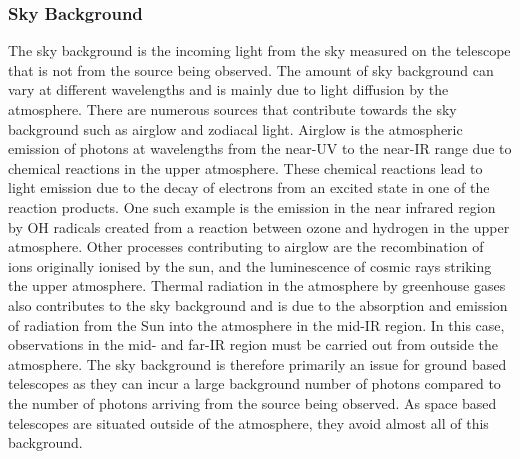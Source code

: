 	\subsubsection{Sky Background} %
	\label{ssub:sky_background}
		The sky background is the incoming light from the sky measured on the telescope that is not from the source being observed. The amount of sky background can vary at different wavelengths and is mainly due to light diffusion by the atmosphere. There are numerous sources that contribute towards the sky background such as airglow and zodiacal light. Airglow is the atmospheric emission of photons at wavelengths from the near-UV to the near-IR range due to chemical reactions in the upper atmosphere\cite[page~9]{atmospheric_radiation_model}. These chemical reactions lead to light emission due to the decay of electrons from an excited state in one of the reaction products. One such example is the emission in the near infrared region by OH radicals created from a reaction between ozone and hydrogen in the upper atmosphere\cite{residual_OH_emission}. Other processes contributing to airglow are the recombination of ions originally ionised by the sun, and the luminescence of cosmic rays striking the upper atmosphere. Thermal radiation in the atmosphere by greenhouse gases also contributes to the sky background and is due to the absorption and emission of radiation from the Sun into the atmosphere in the mid-IR region. In this case, observations in the mid- and far-IR region must be carried out from outside the atmosphere\cite[pages~22--23]{Peter_Schneider_IR}. The sky background is therefore primarily an issue for ground based telescopes as they can incur a large background number of photons compared to the number of photons arriving from the source being observed. As space based telescopes are situated outside of the atmosphere, they avoid almost all of this background.

